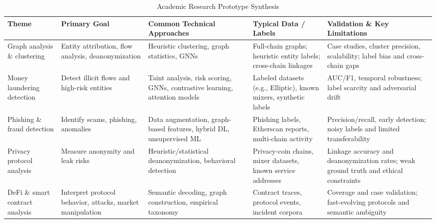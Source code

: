 \documentclass[conference,compsoc]{IEEEtran}
\begin{document}
\begin{table}[htbp]
\centering
\caption{Academic Research Prototype Synthesis}
\label{tab:prototype_synthesis}
\scriptsize
\begin{tabularx}{\textwidth}{XXXXX}
\hline
\textbf{Theme} & \textbf{Primary Goal} & \textbf{Common Technical Approaches} & \textbf{Typical Data / Labels} & \textbf{Validation \& Key Limitations} \\
\hline
Graph analysis \& clustering \cite{meiklejohn2013fistfulbitcoinscharacterizing,reid2013analysisanonymitybitcoin,ron2013quantitativeanalysisfull,androulaki2013evaluatinguserprivacy,wu2023tracerscalablegraphbased,lin2024crosschainabnormaltransaction} & Entity attribution, flow analysis, deanonymization & Heuristic clustering, graph statistics, GNNs & Full-chain graphs; heuristic entity labels; cross-chain linkages & Case studies, cluster precision, scalability; label bias and cross-chain gaps\\
Money laundering detection \cite{moser2013inquirymoneylaundering,moser2014riskscoringbitcoin,weber2019antimoneylaunderingbitcoin,ouyang2024bitcoinmoneylaundering,li2025globallocalgraphattention,lin2024denseflowspottingcryptocurrency} & Detect illicit flows and high-risk entities & Taint analysis, risk scoring, GNNs, contrastive learning, attention models & Labeled datasets (e.g., Elliptic), known mixers, synthetic labels & AUC/F1, temporal robustness; label scarcity and adversarial drift \\
Phishing \& fraud detection \cite{chen2020phishingscamdetection,chen2024ethereumphishingscam,liu2024detectionethereumphishing,pocher2023detectinganomalouscryptocurrency} & Identify scams, phishing, anomalies & Data augmentation, graph-based features, hybrid DL, unsupervised ML & Phishing labels, Etherscan reports, multi-chain activity & Precision/recall, early detection; noisy labels and limited transferability \\
Privacy protocol analysis \cite{kumar2017traceabilityanalysismoneros,kappos2018empiricalanalysisanonymity,wu2021detectingmixingservices} & Measure anonymity and leak risks & Heuristic/statistical deanonymization, behavioral detection & Privacy-coin chains, mixer datasets, known service addresses & Linkage accuracy and deanonymization rates; weak ground truth and ethical constraints \\
DeFi \cite{chen2020understandingethereumgraph,sun2025ethereumfrauddetection,qin2021attackingdefiecosystem,victor2021detectingquantifyingwash}  \& smart contract analysis & Interpret protocol behavior, attacks, market manipulation & Semantic decoding, graph construction, empirical taxonomy & Contract traces, protocol events, incident corpora & Coverage and case validation; fast-evolving protocols and semantic ambiguity \\

\end{tabularx}
\end{table}
\end{document}
